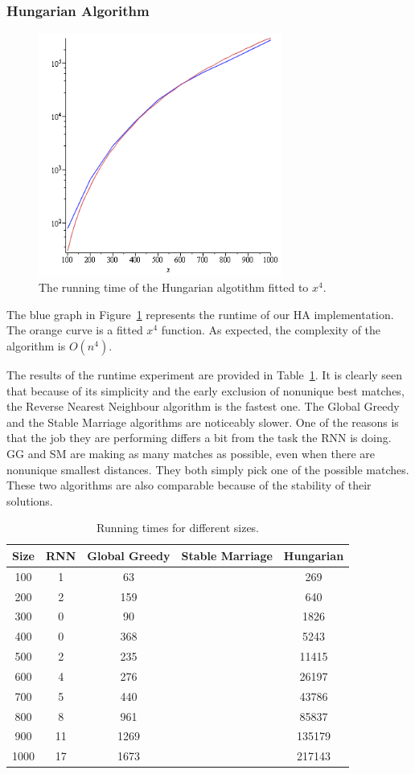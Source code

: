 \documentclass[a4paper,11pt]{article}
\begin{document}
\subsubsection{Hungarian Algorithm}

\begin{figure}[ht!]
\centering 
\includegraphics[width=80mm]{HA_runtime.png}
\caption{The running time of the Hungarian algotithm fitted to $x^4$.}
\label{hung} 
\end{figure}

The blue graph in Figure~\ref{hung} represents the runtime of our HA implementation. The orange curve is a fitted $x^4$ function. As expected, the complexity of the algorithm is $O(n^{4})$.

The results of the runtime experiment are provided in Table~\ref{runtimes}. It is clearly seen that because of its simplicity and the early exclusion of nonunique best matches, the Reverse Nearest Neighbour algorithm is the fastest one. The Global Greedy and the Stable Marriage algorithms are noticeably slower. One of the reasons is that the job they are performing differs a bit from the task the RNN is doing. GG and SM are making as many matches as possible, even when there are nonunique smallest distances. They both simply pick one of the possible matches. These two algorithms are also comparable because of the stability of their solutions.

\begin{table}[tbh]
\centering
\begin{tabular}{|c|c|c|c|c|}
\hline 
Size & RNN & Global Greedy & Stable Marriage & Hungarian \tabularnewline
\hline 
\hline 
 100 & 1 & 63 &  & 269\tabularnewline
\hline
 200 & 2 & 159 &  & 640\tabularnewline
\hline 
 300 & 0 & 90 &  & 1826\tabularnewline
\hline 
 400 & 0 & 368 & & 5243\tabularnewline
\hline 
 500 & 2 & 235 &  & 11415\tabularnewline
\hline 
 600 & 4 & 276 &  & 26197\tabularnewline
\hline 
 700 & 5 & 440 &  & 43786\tabularnewline
\hline
 800 & 8 & 961 &  & 85837\tabularnewline
\hline 
 900 & 11 & 1269 &  & 135179\tabularnewline
\hline
 1000 & 17 & 1673 &  & 217143\tabularnewline
\hline 
\end{tabular}
\caption{Running times for different sizes.}
\label{runtimes}
\end{table}
\end{document}
